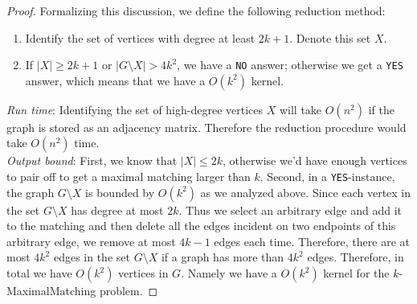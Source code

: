 \documentclass{article}
\begin{document}
\begin{proof}
%

Formalizing this discussion, we define the following reduction method:
\begin{enumerate}
\item Identify the set of vertices with degree at least $2k+1$. Denote this set $X$. 
\item If \(|X| \geq 2k+1\) or \(|G\setminus X| > 4k^2\), we have a \texttt{NO} answer; otherwise we get a \texttt{YES} answer, which means that we have a \(O(k^2)\) kernel. 
\end{enumerate}

\noindent \emph{Run time}: Identifying the set of high-degree vertices $X$ will take $O(n^2)$ if the graph is stored as an adjacency matrix. Therefore the reduction procedure would take \(O(n^2)\) time.\\

\noindent \emph{Output bound}: First, we know that $|X| \leq 2k$, otherwise we'd have enough vertices to pair off to get a maximal matching larger than $k$. Second, in a \texttt{YES}-instance, the graph $G \setminus X$ is bounded by $O(k^2)$ as we analyzed above. Since each vertex in the set \(G \setminus X\) has degree at most \(2k\). Thus we select an arbitrary edge and add it to the matching and then delete all the edges incident on two endpoints of this arbitrary edge, we remove at most \(4k-1\) edges each time. Therefore, there are at most \(4k^2\) edges in the set \(G \setminus X\) if a graph has more than \(4k^2\) edges. Therefore, in total we have \(O(k^2)\) vertices in \(G\). Namely we have a \(O(k^2)\) kernel for the \(k\)-MaximalMatching problem. 
\end{proof}
\end{document}
